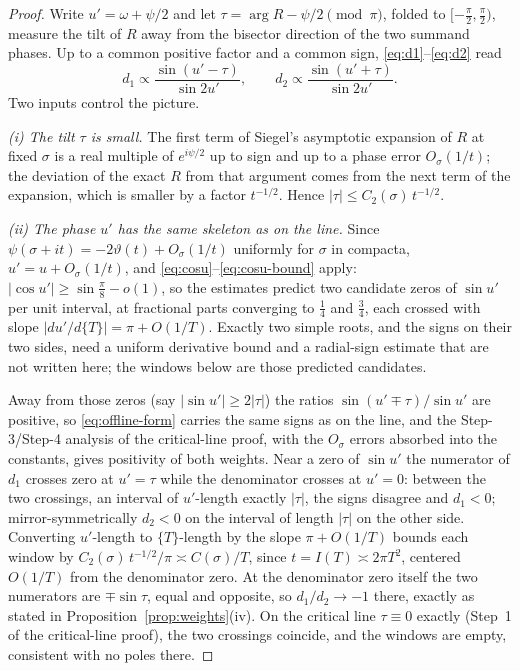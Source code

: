 \documentclass[11pt]{article}
\theoremstyle{definition}
\begin{document}
\begin{proof}
Write $u'=\omega+\psi/2$ and let $\tau=\arg R-\psi/2\pmod\pi$, folded to
$[-\tfrac\pi2,\tfrac\pi2)$, measure the tilt of $R$ away from the bisector
direction of the two summand phases. Up to a common positive factor and a
common sign, \eqref{eq:d1}--\eqref{eq:d2} read
\begin{equation}\label{eq:offline-form}
d_1\propto\frac{\sin(u'-\tau)}{\sin 2u'},
\qquad
d_2\propto\frac{\sin(u'+\tau)}{\sin 2u'}.
\end{equation}
Two inputs control the picture.

\emph{(i) The tilt $\tau$ is small.} The first term of Siegel's asymptotic
expansion of $R$ at fixed $\sigma$ is a real multiple of $e^{i\psi/2}$ up
to sign and up to a phase error $O_\sigma(1/t)$; the deviation of the exact
$R$ from that argument comes from the next term of the expansion, which is
smaller by a factor $t^{-1/2}$. Hence
$|\tau|\leq C_2(\sigma)\,t^{-1/2}$.

\emph{(ii) The phase $u'$ has the same skeleton as on the line.} Since
$\psi(\sigma+it)=-2\vartheta(t)+O_\sigma(1/t)$ uniformly for $\sigma$ in
compacta, $u'=u+O_\sigma(1/t)$, and \eqref{eq:cosu}--\eqref{eq:cosu-bound}
apply: $|\cos u'|\geq\sin\tfrac\pi8-o(1)$, so the estimates predict
two candidate zeros of $\sin u'$ per unit interval, at fractional parts
converging to $\tfrac14$ and $\tfrac34$, each crossed with slope
$|du'/d\{T\}|=\pi+O(1/T)$. Exactly two simple roots, and the signs on
their two sides, need a uniform derivative bound and a radial-sign
estimate that are not written here; the windows below are those
predicted candidates.

Away from those zeros (say $|\sin u'|\geq2|\tau|$) the ratios
$\sin(u'\mp\tau)/\sin u'$ are positive, so \eqref{eq:offline-form} carries
the same signs as on the line, and the Step-3/Step-4 analysis of the
critical-line proof, with the $O_\sigma$ errors absorbed into the
constants, gives positivity of both weights. Near a zero of $\sin u'$ the
numerator of $d_1$ crosses zero at $u'=\tau$ while the denominator crosses
at $u'=0$: between the two crossings, an interval of $u'$-length exactly
$|\tau|$, the signs disagree and $d_1<0$; mirror-symmetrically $d_2<0$ on
the interval of length $|\tau|$ on the other side. Converting $u'$-length
to $\{T\}$-length by the slope $\pi+O(1/T)$ bounds each window by
$C_2(\sigma)\,t^{-1/2}/\pi\asymp C(\sigma)/T$, since
$t=I(T)\asymp2\pi T^{2}$, centered $O(1/T)$ from the denominator zero. At
the denominator zero itself the two numerators are $\mp\sin\tau$, equal
and opposite, so $d_1/d_2\to-1$ there, exactly as stated in
Proposition~\ref{prop:weights}(iv). On the critical line $\tau\equiv0$
exactly (Step~1 of the critical-line proof), the two crossings coincide,
and the windows are empty, consistent with no poles there.
\end{proof}
\end{document}
